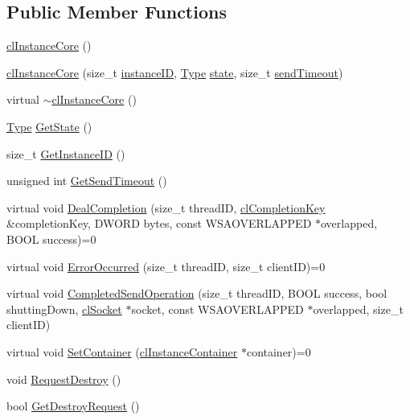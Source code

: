 \subsection*{Public Member Functions}
\begin{DoxyCompactItemize}
\item 
\hyperlink{classcl_instance_core_a23effe8840b9ad7a5b9c899e3332d8d5}{clInstanceCore} ()
\item 
\hyperlink{classcl_instance_core_af0d4c297b8b2b5f8a4e96eb8db4c0fd3}{clInstanceCore} (size\_\-t \hyperlink{classcl_instance_core_ad3de74dbad74098dc2f010806186bf7f}{instanceID}, \hyperlink{classcl_instance_core_a576bdbf2ccec2df9cb2aab1edfe9dd2e}{Type} \hyperlink{classcl_instance_core_a09705e1a816f5720469b7931d7d7fc0d}{state}, size\_\-t \hyperlink{classcl_instance_core_a05be31d3ac12930f23fb1a06c25b225c}{sendTimeout})
\item 
virtual \hyperlink{classcl_instance_core_a01d4c8e66c5a058b7000acffde8e0179}{$\sim$clInstanceCore} ()
\item 
\hyperlink{classcl_instance_core_a576bdbf2ccec2df9cb2aab1edfe9dd2e}{Type} \hyperlink{classcl_instance_core_a4a921fab6c7832cbdd41d7144ad7881b}{GetState} ()
\item 
size\_\-t \hyperlink{classcl_instance_core_a9b562e4ed72e3f291df54da562527498}{GetInstanceID} ()
\item 
unsigned int \hyperlink{classcl_instance_core_ac409d7c75418026b9d4f1909f80e07a4}{GetSendTimeout} ()
\item 
virtual void \hyperlink{classcl_instance_core_afb72728b46b08c2928845cd67acc238d}{DealCompletion} (size\_\-t threadID, \hyperlink{classcl_completion_key}{clCompletionKey} \&completionKey, DWORD bytes, const WSAOVERLAPPED $\ast$overlapped, BOOL success)=0
\item 
virtual void \hyperlink{classcl_instance_core_ad5359146ac131598d7f6b86e10577738}{ErrorOccurred} (size\_\-t threadID, size\_\-t clientID)=0
\item 
virtual void \hyperlink{classcl_instance_core_a5eb49c613f5b8a49d079fdc66e9f8fd6}{CompletedSendOperation} (size\_\-t threadID, BOOL success, bool shuttingDown, \hyperlink{classcl_socket}{clSocket} $\ast$socket, const WSAOVERLAPPED $\ast$overlapped, size\_\-t clientID)
\item 
virtual void \hyperlink{classcl_instance_core_ad2eda53d7f3ba76c2fef2d08e868b81c}{SetContainer} (\hyperlink{classcl_instance_container}{clInstanceContainer} $\ast$container)=0
\item 
void \hyperlink{classcl_instance_core_a7c934d532e702646d98f66302b4aa991}{RequestDestroy} ()
\item 
bool \hyperlink{classcl_instance_core_aafb188a87bf02b916e9cd3c5a15ae7fd}{GetDestroyRequest} ()
\end{DoxyCompactItemize}

